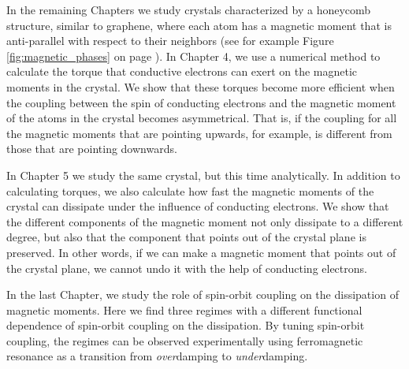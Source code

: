 In the remaining Chapters we study crystals characterized by a honeycomb structure, similar to graphene, where each atom has a magnetic moment that is anti-parallel with respect to their neighbors (see for example Figure \ref{fig:magnetic_phases} on page \pageref{fig:magnetic_phases}). In Chapter 4, we use a numerical method to calculate the torque that conductive electrons can exert on the magnetic moments in the crystal. We show that these torques become more efficient when the coupling between the spin of conducting electrons and the magnetic moment of the atoms in the crystal becomes asymmetrical. That is, if the coupling for all the magnetic moments that are pointing upwards, for example, is different from those that are pointing downwards.

In Chapter 5 we study the same crystal, but this time analytically. In addition to calculating torques, we also calculate how fast the magnetic moments of the crystal can dissipate under the influence of conducting electrons. We show that the different components of the magnetic moment not only dissipate to a different degree, but also that the component that points out of the crystal plane is preserved. In other words, if we can make a magnetic moment that points out of the crystal plane, we cannot undo it with the help of conducting electrons.

In the last Chapter, we study the role of spin-orbit coupling on the dissipation of magnetic moments. Here we find three regimes with a different functional dependence of spin-orbit coupling on the dissipation. By tuning spin-orbit coupling, the regimes can be observed experimentally using ferromagnetic resonance as a transition from \emph{over}damping to \emph{under}damping. 